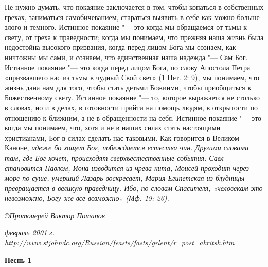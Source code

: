 Не нужно думать, что покаяние заключается в том,
чтобы копаться в собственных грехах, заниматься
самобичеванием, стараться выявить в себе как
можно больше злого и темного. Истинное покаяние
"--- это когда мы обращаемся от тьмы к свету, от
греха к праведности; когда мы понимаем, что
прежняя наша жизнь была недостойна высокого
призвания, когда перед лицом Бога мы сознаем, как
ничтожны мы сами, и сознаем, что единственная
наша надежда "--- Сам Бог. Истинное покаяние "--- это
когда перед лицом Бога, по слову Апостола Петра
«призвавшего нас из тьмы в чудный Свой свет» (1
Пет. 2: 9), мы понимаем, что жизнь дана нам для того,
чтобы стать детьми Божиими, чтобы приобщиться к
Божественному свету. Истинное покаяние "--- то,
которое выражается не столько в словах, но и в
делах, в готовности прийти на помощь людям, в
открытости по отношению к ближним, а не в
обращенности на себя. Истинное покаяние "--- это
когда мы понимаем, что, хотя и не в наших силах
стать настоящими христианами, Бог в силах
сделать нас таковыми. Как говорится в Великом
Каноне, \itshape идеже бо хощет Бог, побеждается
естества чин\normalfont{}. Другими словами там, где Бог
хочет, происходят сверхъестественные события:
Савл становится Павлом, Иона изводится из чрева
кита, Моисей проходит через море по суше, умерший
Лазарь воскресает, Мария Египетская из блудницы
превращается в великую праведницу. Ибо, по словам
Спасителя, «человекам это невозможно, Богу же все
возможно» (Мф. 19: 26). 


\itshape ©Протоиерей Виктор Потапов\normalfont{}


\itshape  февраль 2001 г.\normalfont{}
http://www.stjohndc.org/Russian/feasts/fasts/grlent/r_post_akritsk.htm


\medskip

\medskip

\medskip

\mychapterending

 

\mychapterending

 






\bfseries Песнь 1\normalfont{}


